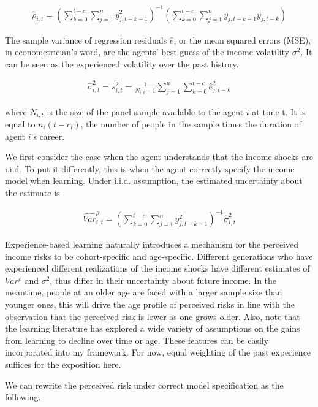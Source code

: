 \documentclass[12pt,notitlepage,onecolumn,aps,pra]{article}
\begin{document}
\begin{eqnarray}
\hat \rho_{i,t} = (\sum^{t-c}_{k=0}\sum^{n}_{j=1}y^2_{j,t-k-1})^{-1}(\sum^{t-c}_{k=0}\sum^{n}_{j=1}y_{j,t-k-1}y_{j,t-k})
\end{eqnarray}

The sample variance of regression residuals \(\widehat e\), or the mean
squared errors (MSE), in econometrician's word, are the agents' best
guess of the income volatility \(\sigma^2\). It can be seen as the
experienced volatility over the past history.

\begin{eqnarray}
\widehat{\sigma}^2_{i,t} = s^2_{i,t} = \frac{1}{N_{i,t}-1} \sum^{n}_{j=1}\sum^{t-c}_{k=0} \hat e_{j,t-k}^2
\end{eqnarray}

where \(N_{i,t}\) is the size of the panel sample available to the agent
\(i\) at time t. It is equal to \(n_{i}(t-c_{i})\), the number of people
in the sample times the duration of agent \(i\)'s career.

We first consider the case when the agent understands that the income
shocks are i.i.d. To put it differently, this is when the agent
correctly specify the income model when learning. Under i.i.d.
assumption, the estimated uncertainty about the estimate is

\begin{eqnarray}
\widehat {Var}^{\rho}_{i,t} = (\sum^{t-c}_{k=0}\sum^{n}_{j=1}y^2_{j,t-k-1})^{-1}\widehat{\sigma}^2_{i,t}
\end{eqnarray}

Experience-based learning naturally introduces a mechanism for the
perceived income risks to be cohort-specific and age-specific. Different
generations who have experienced different realizations of the income
shocks have different estimates of \(Var^{\rho}\) and \(\sigma^2\), thus
differ in their uncertainty about future income. In the meantime, people
at an older age are faced with a larger sample size than younger ones,
this will drive the age profile of perceived risks in line with the
observation that the perceived risk is lower as one grows older. Also,
note that the learning literature has explored a wide variety of
assumptions on the gains from learning to decline over time or age.
These features can be easily incorporated into my framework. For now,
equal weighting of the past experience suffices for the exposition here.

We can rewrite the perceived risk under correct model specification as
the following.
\end{document}
